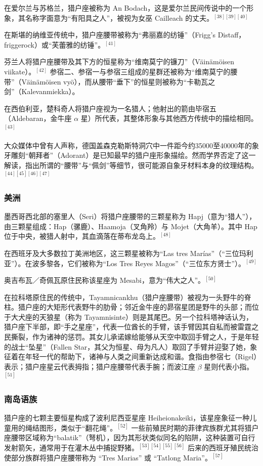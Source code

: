在爱尔兰与苏格兰，猎户座被称为 An Bodach，这是爱尔兰民间传说中的一个形象，其名称字面意为“有阳具之人”，被视为女巫 Cailleach 的丈夫。$^{[38][39][40]}$

在斯堪的纳维亚传统中，猎户座腰带被称为“弗丽嘉的纺锤”（Frigg's Distaff，friggerock）或“芙蕾雅的纺锤”。$^{[41]}$

芬兰人将猎户座腰带及其下方的恒星称为“维南莫宁的镰刀”（Väinämöisen viikate）。$^{[42]}$ 参宿二、参宿一与参宿三组成的星群还被称为“维南莫宁的腰带”（Väinämöisen vyö），而从腰带“垂下”的恒星则被称为“卡勒瓦之剑”（Kalevanmiekka）。

在西伯利亚，楚科奇人将猎户座视为一名猎人；他射出的箭由毕宿五（Aldebaran，金牛座 $\alpha$ 星）所代表，其整体形象与其他西方传统中的描绘相同。$^{[43]}$

大众媒体中曾有人声称，德国盖森克勒斯特洞穴中一件距今约35000至40000年的象牙雕刻“朝拜者”（Adorant）是已知最早的猎户座形象描绘。然而学界否定了这一解读，指出所谓的“腰带”与“佩剑”等细节，很可能源自象牙材料本身的纹理结构。$^{[44][45][46][47]}$
\subsubsection{美洲}  
墨西哥西北部的塞里人（Seri）将猎户座腰带的三颗星称为 Hapj（意为“猎人”），由三颗星组成：Hap（骡鹿）、Haamoja（叉角羚）与 Mojet（大角羊）。其中 Hap 位于中央，被猎人射中，其血滴落在蒂布龙岛上。$^{[48]}$

在西班牙及大多数拉丁美洲地区，这三颗星被称为“Las tres Marías”（“三位玛利亚”）。在波多黎各，它们被称为“Los Tres Reyes Magos”（“三位东方贤士”）。$^{[49]}$

奥吉布瓦／奇佩瓦原住民称该星座为 Mesabi，意为“伟大之人”。$^{[50]}$

在拉科塔原住民的传统中，Tayamnicankhu（猎户座腰带）被视为一头野牛的脊柱。猎户座的大矩形代表野牛的肋骨；邻近金牛座的昴宿星团是野牛的头部；而位于大犬座的天狼星（称为 Tayamnisinte）则是其尾巴。另一个拉科塔神话认为，猎户座下半部，即“手之星座”，代表一位酋长的手臂，该手臂因其自私而被雷霆之民撕裂，作为诸神的惩罚。其女儿承诺嫁给能够从天空中取回手臂之人，于是年轻的战士“坠星”（Fallen Star，其父为恒星、母为凡人）取回了手臂并迎娶了她，象征着在年轻一代的帮助下，诸神与人类之间重新达成和谐。食指由参宿七（Rigel）表示；猎户座星云代表拇指；猎户座腰带代表手腕；而波江座 $\beta$ 星则代表小指。$^{[51]}$
\subsubsection{南岛语族}  
猎户座的七颗主要恒星构成了波利尼西亚星座 Heiheionakeiki，该星座象征一种儿童用的绳结图形，类似于“翻花绳”。$^{[52]}$ 一些前殖民时期的菲律宾族群尤其将猎户座腰带区域称为“balatik”（弩机），因为其形状类似同名的陷阱，这种装置可自行发射箭矢，通常用于在灌木丛中捕捉野猪。$^{[53][54][55][56]}$ 后来的西班牙殖民统治使部分族群将猎户座腰带称为 “Tres Marias” 或 “Tatlong Maria”。$^{[57]}$

